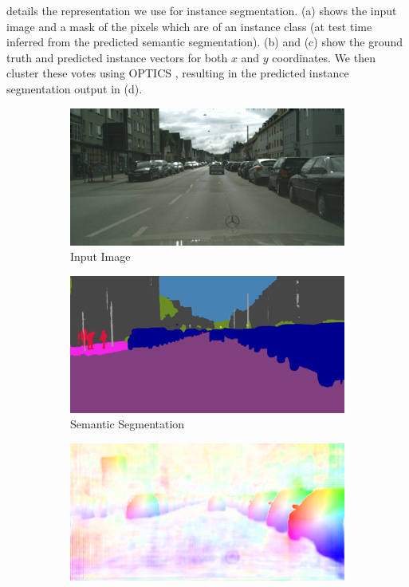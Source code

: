 details the representation we use for instance segmentation. (a) shows the input image and a mask of the pixels which are of an instance class (at test time inferred from the predicted semantic segmentation). (b) and (c) show the ground truth and predicted instance vectors for both $x$ and $y$ coordinates. We then cluster these votes using OPTICS \cite{ankerst1999optics}, resulting in the predicted instance segmentation output in (d).

\begin{figure}[t]
\begin{center}
\begin{subfigure}[t]{0.48\linewidth}
  \includegraphics[width=\linewidth]{example_instance/bielefeld_000000_001011_leftImg8bit.png}
  \caption{Input Image}
\end{subfigure}
\begin{subfigure}[t]{0.48\linewidth}
  \includegraphics[width=\linewidth]{example_instance/bielefeld_000000_001011_semantic_segmentation_rgb.png}
  \caption{Semantic Segmentation}
\end{subfigure}
\begin{subfigure}[t]{0.48\linewidth}
  \includegraphics[width=\linewidth]{example_instance/bielefeld_000000_001011_instance_prediction.png}

\end{subfigure}
\end{center}
\end{figure}
